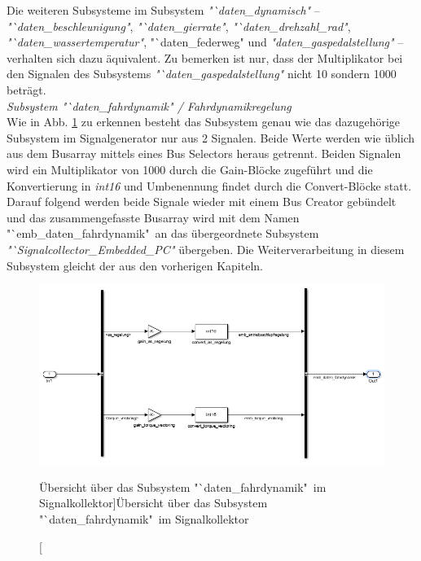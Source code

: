 \documentclass[fontsize = 12pt, paper = a4]{scrreprt}
\begin{document}
\newpage


Die weiteren Subsysteme im Subsystem \textit{"`daten\_dynamisch"} -- \textit{"`daten\_beschleunigung"}, \textit{"`daten\_gierrate"}, \textit{"`daten\_drehzahl\_rad"}, \textit{"`daten\_wassertemperatur"}, "`daten\_federweg" und \textit{"daten\_gaspedalstellung"} -- verhalten sich dazu äquivalent. Zu bemerken ist nur, dass der Multiplikator bei den Signalen des Subsystems \textit{"`daten\_gaspedalstellung"} nicht 10 sondern 1000 beträgt. \\


\textit{Subsystem "`daten\_fahrdynamik" / Fahrdynamikregelung} \\

Wie in Abb. \ref{scdatenfahrdynamik} zu erkennen besteht das Subsystem genau wie das dazugehörige Subsystem im Signalgenerator nur aus 2 Signalen. Beide Werte werden wie üblich aus dem Busarray mittels eines Bus Selectors heraus getrennt. Beiden Signalen wird ein Multiplikator von 1000 durch die Gain-Blöcke zugeführt und die Konvertierung in \textit{int16} und Umbenennung findet durch die Convert-Blöcke statt. Darauf folgend werden beide Signale wieder mit einem Bus Creator gebündelt und das zusammengefasste Busarray wird mit dem Namen "`emb\_daten\_fahrdynamik"\ an das übergeordnete Subsystem \textit{"`Signalcollector\_Embedded\_PC"} übergeben. Die Weiterverarbeitung in diesem Subsystem gleicht der aus den vorherigen Kapiteln.

\begin{figure}[h]
\centering
\includegraphics[scale = 0.75]{sc_daten_fahrdynamik}
\caption[Übersicht über das Subsystem "`daten\_fahrdynamik"\ im Signalkollektor]{Übersicht über das Subsystem "`daten\_fahrdynamik"\ im Signalkollektor}
\label{scdatenfahrdynamik}
\end{figure}
\end{document}
